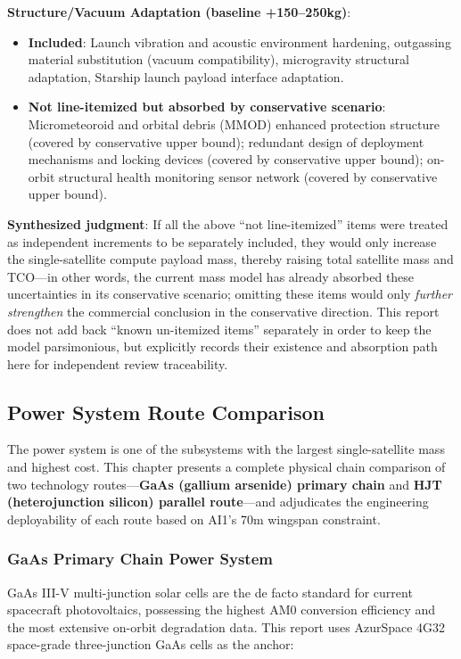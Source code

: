 \noindent\textbf{Structure/Vacuum Adaptation (baseline +150--250\;kg)}:
\begin{itemize}[leftmargin=*]
    \item \textbf{Included}: Launch vibration and acoustic environment hardening, outgassing material substitution (vacuum compatibility), microgravity structural adaptation, Starship launch payload interface adaptation.
    \item \textbf{Not line-itemized but absorbed by conservative scenario}: Micrometeoroid and orbital debris (MMOD) enhanced protection structure (covered by conservative upper bound); redundant design of deployment mechanisms and locking devices (covered by conservative upper bound); on-orbit structural health monitoring sensor network (covered by conservative upper bound).
\end{itemize}

\noindent\textbf{Synthesized judgment}: If all the above ``not line-itemized'' items were treated as independent increments to be separately included, they would only increase the single-satellite compute payload mass, thereby raising total satellite mass and TCO---in other words, the current mass model has already absorbed these uncertainties in its conservative scenario; omitting these items would only \emph{further strengthen} the commercial conclusion in the conservative direction. This report does not add back ``known un-itemized items'' separately in order to keep the model parsimonious, but explicitly records their existence and absorption path here for independent review traceability.

\subsection{Power System Route Comparison}

The power system is one of the subsystems with the largest single-satellite mass and highest cost. This chapter presents a complete physical chain comparison of two technology routes---\textbf{GaAs (gallium arsenide) primary chain} and \textbf{HJT (heterojunction silicon) parallel route}---and adjudicates the engineering deployability of each route based on AI1's 70\;m wingspan constraint.

\subsubsection{GaAs Primary Chain Power System}

GaAs III-V multi-junction solar cells are the de facto standard for current spacecraft photovoltaics, possessing the highest AM0 conversion efficiency and the most extensive on-orbit degradation data. This report uses AzurSpace 4G32 space-grade three-junction GaAs cells as the anchor:

